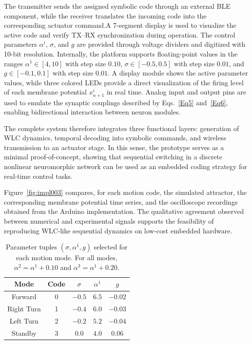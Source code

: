 \documentclass[lettersize,journal]{IEEEtran}
\begin{document}
The transmitter sends the assigned symbolic code through an external BLE component, while the receiver translates the incoming code into the corresponding actuator command.A 7-segment display is used to visualize the active code and verify TX--RX synchronization during operation. The control parameters $\alpha^i$, $\sigma$, and $g$ are provided through voltage dividers and digitized with 10-bit resolution. Internally, the platform supports floating-point values in the ranges $\alpha^1\in[4,10]$ with step size $0.10$, $\sigma\in[-0.5,0.5]$ with step size $0.01$, and $g\in[-0.1,0.1]$ with step size $0.01$. A display module shows the active parameter values, while three colored LEDs provide a direct visualization of the firing level of each membrane potential $x_{n+1}^i$ in real time. Analog input and output pins are used to emulate the synaptic couplings described by Eqs.~\ref{Eq5} and~\ref{Eq6}, enabling bidirectional interaction between neuron modules.

The complete system therefore integrates three functional layers: generation of WLC dynamics, temporal decoding into symbolic commands, and wireless transmission to an actuator stage. In this sense, the prototype serves as a minimal proof-of-concept, showing that sequential switching in a discrete nonlinear neuromorphic network can be used as an embedded coding strategy for real-time control tasks.

Figure~\ref{fig:impl003} compares, for each motion code, the simulated attractor, the corresponding membrane potential time series, and the oscilloscope recordings obtained from the Arduino implementation. The qualitative agreement observed between numerical and experimental signals supports the feasibility of reproducing WLC-like sequential dynamics on low-cost embedded hardware.

\begin{table}[htbp]
\begin{center}
\caption{Parameter tuples $(\sigma,\alpha^1,g)$ selected for each motion mode. For all modes, $\alpha^2=\alpha^1+0.10$ and $\alpha^3=\alpha^1+0.20$.}
\label{tab:tuplas}
\begin{tabular}{| c | c | c | c | c |}
\hline
Mode & Code & $\sigma$ & $\alpha^1$ & $g$\\
\hline
 Forward    & 0 & $-0.5$ & $6.5$ & $-0.02$\\
\hline
 Right Turn & 1 & $-0.4$ & $6.0$ & $-0.03$ \\ 
\hline
Left Turn  & 2 & $-0.2$ & $5.2$ & $-0.04$ \\
\hline 
 Standby    & 3 & $0.0$  & $4.0$ & $0.06$\\
\hline 
\end{tabular}
\end{center}
\end{table}
\end{document}

